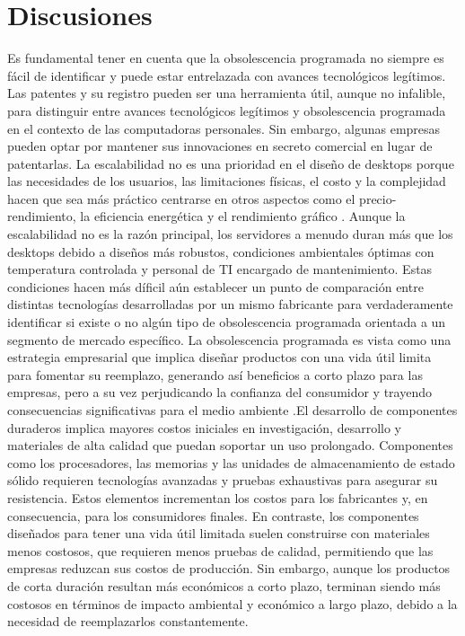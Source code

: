 \documentclass[10pt,journal,compsoc]{IEEEtran}
\begin{document}
\section{Discusiones}
Es fundamental tener en cuenta que la obsolescencia programada no siempre es fácil de identificar y puede estar entrelazada con avances tecnológicos legítimos. Las patentes y su registro pueden ser una herramienta útil, aunque no infalible, para distinguir entre avances tecnológicos legítimos \cite{6116759} \cite{8714681} y obsolescencia programada en el contexto de las computadoras personales. Sin embargo, algunas empresas pueden optar por mantener sus innovaciones en secreto comercial en lugar de patentarlas\cite{871503}.
La escalabilidad no es una prioridad en el diseño de desktops porque las necesidades de los usuarios, las limitaciones físicas, el costo y la complejidad hacen que sea más práctico centrarse en otros aspectos como el precio-rendimiento, la eficiencia energética y el rendimiento gráfico \cite{hennessy2017computer}. Aunque la escalabilidad no es la razón principal, los servidores a menudo duran más que los desktops debido a diseños más robustos, condiciones ambientales óptimas con temperatura controlada y personal de TI encargado de mantenimiento. Estas condiciones hacen más díficil aún establecer un punto de comparación entre distintas tecnologías desarrolladas por un mismo fabricante para verdaderamente identificar si existe o no algún tipo de obsolescencia programada orientada a un segmento de mercado específico.
La obsolescencia programada es vista como una estrategia empresarial que implica diseñar productos con una vida útil limita para fomentar su reemplazo, generando así beneficios a corto plazo para las empresas, pero a su vez perjudicando la confianza del consumidor y trayendo consecuencias significativas para el medio ambiente \cite{bisschop2022designed}.El desarrollo de componentes duraderos implica mayores costos iniciales en investigación, desarrollo y materiales de alta calidad que puedan soportar un uso prolongado. Componentes como los procesadores, las memorias y las unidades de almacenamiento de estado sólido requieren tecnologías avanzadas y pruebas exhaustivas para asegurar su resistencia. Estos elementos incrementan los costos para los fabricantes y, en consecuencia, para los consumidores finales. En contraste, los componentes diseñados para tener una vida útil limitada suelen construirse con materiales menos costosos, que requieren menos pruebas de calidad, permitiendo que las empresas reduzcan sus costos de producción. Sin embargo, aunque los productos de corta duración resultan más económicos a corto plazo, terminan siendo más costosos en términos de impacto ambiental y económico a largo plazo, debido a la necesidad de reemplazarlos constantemente.
\end{document}
